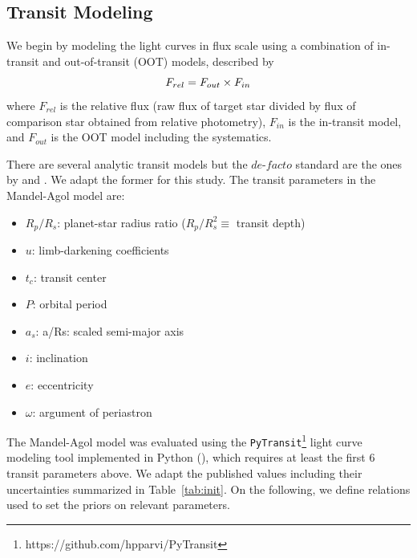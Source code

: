 \subsection{Transit Modeling}\label{sec:transitmodel}
We begin by modeling the light curves in flux scale using a combination of in-transit and out-of-transit (OOT) models, described by
\begin{equation}\label{eq:lc}
F_{rel}=F_{out}\times F_{in} \\
\end{equation}
where $F_{rel}$ is the relative flux (raw flux of target star divided by flux of comparison star obtained from relative photometry), $F_{in}$ is the in-transit model, and $F_{out}$ is the OOT model including the systematics.

There are several analytic transit models but the $de$-$facto$ standard are the ones by \cite{MandelAgol2002} and \cite{Gimenez2006}. We adapt the former for this study. The transit parameters in the Mandel-Agol model are:
\begin{itemize}[noitemsep]
 \item $R_p/R_s$: planet-star radius ratio ($R_p/R_s^2\equiv$ transit depth)\\
 \item $u$: limb-darkening coefficients\\
 \item $t_c$:    transit center\\
 \item $P$:     orbital period\\
 \item $a_s$:   a/Rs: scaled semi-major axis\\
 \item $i$:     inclination\\
 \item $e$:     eccentricity\\
 \item $\omega$:     argument of periastron\\
\end{itemize}
The Mandel-Agol model was evaluated using the \verb'PyTransit'\footnote{https://github.com/hpparvi/PyTransit} light curve modeling tool implemented in Python (\cite{Parviainen2015}), which requires at least the first 6 transit parameters above. We adapt the published values including their uncertainties summarized in Table~\ref{tab:init}. On the following, we define relations used to set the priors on relevant parameters.

